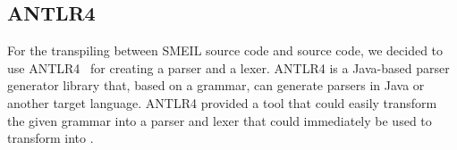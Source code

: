 %
%





\subsection{ANTLR4}
For the transpiling between SMEIL source code and \cspm{} source code, we decided to use ANTLR4~\cite{antlr} for creating a parser and a lexer. ANTLR4 is a Java-based parser generator library that, based on a grammar, can generate parsers in Java or another target language. ANTLR4 provided a tool that could easily transform the given grammar into a parser and lexer that could immediately be used to transform into \cspm{}.


